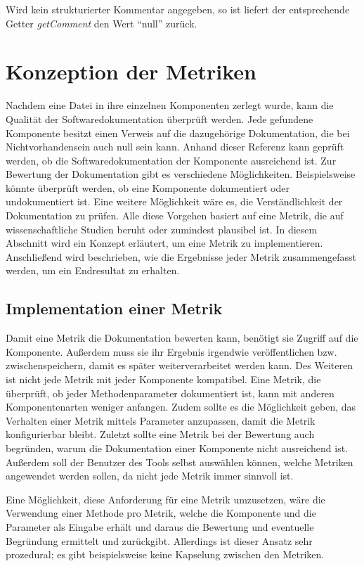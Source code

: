  Wird kein strukturierter Kommentar angegeben, so ist liefert der entsprechende Getter \textit{getComment} den Wert \enquote{null} zurück. 
\section{Konzeption der Metriken}
Nachdem eine Datei in ihre einzelnen Komponenten zerlegt wurde, kann die Qualität der Softwaredokumentation überprüft werden. Jede gefundene Komponente besitzt einen Verweis auf die dazugehörige Dokumentation, die bei Nichtvorhandensein auch null sein kann. Anhand dieser Referenz kann geprüft werden, ob die Softwaredokumentation der Komponente ausreichend ist. Zur Bewertung der Dokumentation gibt es verschiedene  Möglichkeiten. Beispielsweise könnte überprüft werden, ob eine Komponente dokumentiert oder undokumentiert ist. Eine weitere Möglichkeit wäre es, die Verständlichkeit der Dokumentation zu prüfen. Alle diese Vorgehen basiert auf eine Metrik, die auf wissenschaftliche Studien beruht oder zumindest plausibel ist. In diesem Abschnitt wird ein Konzept erläutert, um eine Metrik zu implementieren. Anschließend wird beschrieben, wie die Ergebnisse jeder Metrik zusammengefasst werden, um ein Endresultat zu erhalten. 

\subsection{Implementation einer Metrik}\label{chapter:metric_impl}
Damit eine Metrik die Dokumentation bewerten kann, benötigt sie Zugriff auf die Komponente. Außerdem muss sie ihr Ergebnis irgendwie veröffentlichen bzw. zwischenspeichern, damit es später weiterverarbeitet werden kann. Des Weiteren ist nicht jede Metrik mit jeder Komponente kompatibel. Eine Metrik, die überprüft, ob jeder Methodenparameter dokumentiert ist, kann mit anderen Komponentenarten weniger anfangen. Zudem sollte es die Möglichkeit geben, das Verhalten einer Metrik mittels Parameter anzupassen, damit die Metrik konfigurierbar bleibt. Zuletzt sollte eine Metrik bei der Bewertung auch begründen, warum die Dokumentation einer Komponente nicht ausreichend ist. Außerdem soll der Benutzer des Tools selbst auswählen können, welche Metriken angewendet werden sollen, da nicht jede Metrik immer sinnvoll ist. 

Eine Möglichkeit, diese Anforderung für eine Metrik umzusetzen, wäre die Verwendung einer Methode pro Metrik, welche die Komponente und die Parameter als Eingabe erhält und daraus die Bewertung und eventuelle Begründung ermittelt und zurückgibt. Allerdings ist dieser Ansatz sehr prozedural; es gibt beispielsweise keine Kapselung zwischen den Metriken.  

